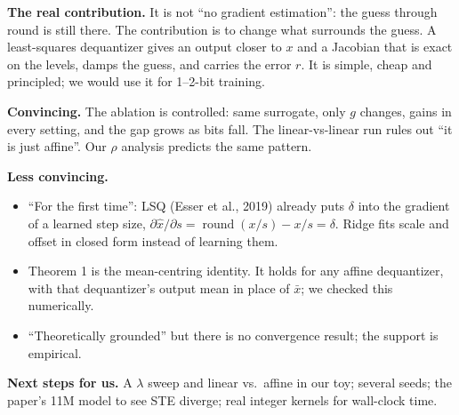 \documentclass[11pt]{article}
\begin{document}
\textbf{The real contribution.} It is not ``no gradient estimation'': the guess through round is still there. The contribution is to change what surrounds the guess. A least-squares dequantizer gives an output closer to $x$ and a Jacobian that is exact on the levels, damps the guess, and carries the error $r$. It is simple, cheap and principled; we would use it for 1--2-bit training.

\vspace{6pt}
\textbf{Convincing.} The ablation is controlled: same surrogate, only $g$ changes, gains in every setting, and the gap grows as bits fall. The linear-vs-linear run rules out ``it is just affine''. Our $\rho$ analysis predicts the same pattern.

\vspace{6pt}
\textbf{Less convincing.}
\begin{itemize}
\item ``For the first time'': LSQ (Esser et al., 2019) already puts $\delta$ into the gradient of a learned step size, $\partial\hat x/\partial s=\operatorname{round}(x/s)-x/s=\delta$. Ridge fits scale and offset in closed form instead of learning them.
\item Theorem 1 is the mean-centring identity. It holds for any affine dequantizer, with that dequantizer's output mean in place of $\bar x$; we checked this numerically.
\item ``Theoretically grounded'' but there is no convergence result; the support is empirical.
\end{itemize}

\textbf{Next steps for us.} A $\lambda$ sweep and linear vs.\ affine in our toy; several seeds; the paper's 11M model to see STE diverge; real integer kernels for wall-clock time.

\vfill
{}
\end{document}
